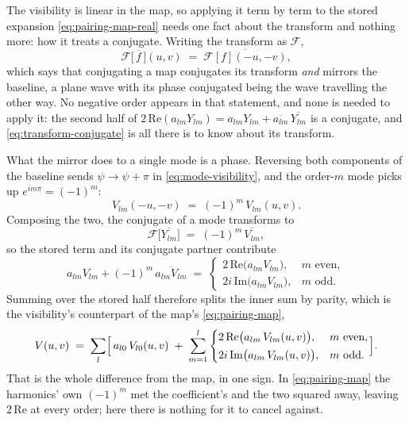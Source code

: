 The visibility is linear in the map, so applying it term by term to the stored expansion
\eqref{eq:pairing-map-real} needs one fact about the transform and nothing more: how it
treats a conjugate.  Writing the transform as $\mathcal{F}$,
\begin{equation}
  \mathcal{F}\bigl[\,\overline{f}\,\bigr](u,v)
  \;=\; \overline{\mathcal{F}[f](-u,-v)} ,
  \label{eq:transform-conjugate}
\end{equation}
which says that conjugating a map conjugates its transform \emph{and} mirrors the baseline,
a plane wave with its phase conjugated being the wave travelling the other way.  No negative
order appears in that statement, and none is needed to apply it: the second half of
$2\,\mathrm{Re}(a_{lm}Y_{lm}) = a_{lm}Y_{lm} + \overline{a_{lm}}\,\overline{Y_{lm}}$ is a
conjugate, and \eqref{eq:transform-conjugate} is all there is to know about its transform.

What the mirror does to a single mode is a phase.  Reversing both components of the baseline
sends $\psi \to \psi + \pi$ in \eqref{eq:mode-visibility}, and the order-$m$ mode picks up
$e^{im\pi} = (-1)^m$:
\begin{equation}
  V_{lm}(-u,-v) \;=\; (-1)^m\,V_{lm}(u,v) .
  \label{eq:pairing-baseline-sign}
\end{equation}
Composing the two, the conjugate of a mode transforms to
\begin{equation}
  \mathcal{F}\bigl[\overline{Y_{lm}}\bigr] \;=\; (-1)^m\,\overline{V_{lm}} ,
  \label{eq:pairing-v-negative}
\end{equation}
so the stored term and its conjugate partner contribute
\begin{equation}
  a_{lm}V_{lm} + (-1)^m\,\overline{a_{lm}V_{lm}}
  \;=\;
  \begin{cases}
    2\,\mathrm{Re}\bigl(a_{lm}V_{lm}\bigr) , & m \text{ even},\\[2pt]
    2i\,\mathrm{Im}\bigl(a_{lm}V_{lm}\bigr) , & m \text{ odd}.
  \end{cases}
  \label{eq:pairing-contribution}
\end{equation}
Summing over the stored half therefore splits the inner sum by parity, which is the
visibility's counterpart of the map's \eqref{eq:pairing-map},
\begin{equation}
  V(u,v) \;=\; \sum_{l}\Bigl[\, a_{l0}\,V_{l0}(u,v)
    \;+\; \sum_{m=1}^{l}
      \begin{cases}
        2\,\mathrm{Re}\bigl( a_{lm}\,V_{lm}(u,v) \bigr) , & m \text{ even},\\[2pt]
        2i\,\mathrm{Im}\bigl( a_{lm}\,V_{lm}(u,v) \bigr) , & m \text{ odd}.
      \end{cases}
  \Bigr] .
  \label{eq:pairing-visibility-parity}
\end{equation}
That is the whole difference from the map, in one sign.  In \eqref{eq:pairing-map} the
harmonics' own $(-1)^m$ met the coefficient's and the two squared away, leaving
$2\,\mathrm{Re}$ at every order; here there is nothing for it to cancel against.

